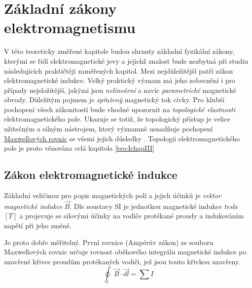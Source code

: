 \setchaptertoc
\chapter{Základní zákony elektromagnetismu}\label{teo:IchapII}
  V této teoreticky změřené kapitole budou shrnuty základní fyzikální zákony, kterými se řídí
  elektromagnetické jevy a jejichž znalost bude nezbytná při studiu následujících praktičtěji
  zaměřených kapitol. Mezi nejdůležitější patří zákon elektromagnetické indukce. Velký praktický
  význam má jeho zobecnění i pro případy nejsložitější, jakými jsou \emph{nelineární} a navíc
  \emph{parametrické} magnetické obvody. Důležitým pojmem je \emph{spřažený} magnetický tok cívky.
  Pro hlubší pochopení všech zákonitostí bude vhodné upozornit na \emph{topologické vlastnosti}
  elektromagnetického pole. Ukazuje se totiž, že topologický přístup je velice užitečným a silným
  nástrojem, který významně usnadňuje pochopení
  \href{http://en.wikipedia.org/wiki/Maxwell_theory}{Maxwellových rovnic} se všemi jejich důsledky
  \cite[s.~6]{Patocka4}. Topologii elektromagnetického pole je proto věnována celá kapitola
  \ref{teo:IchapIII}
  
  \section{Zákon elektromagnetické indukce}\label{teo:IchapIIsecI}
    Základní veličinou pro popis magnetických polí a jejich účinků je \emph{vektor magnetické
    indukce} \(\vec{B}\). Dle soustavy SI je jednotkou magnetické indukce \emph{tesla} \([T]\) a
    projevuje se silovými účinky na vodiče protékané proudy a indukováním napětí při jeho změně.

    Je proto dobře měřitelný. První rovnice (Ampérův zákon) ze souboru Maxwellových rovnic určuje
    rovnost oběhového integrálu magnetické indukce po uzavřené křivce proudům protékaných vodiči,
    jež jsou touto křivkou uzavřeny.
    \begin{equation}\label{es:eq_amp_law}
      \oint_l \vec{B} \cdot \vec{dl} = \sum I
    \end{equation}
    

